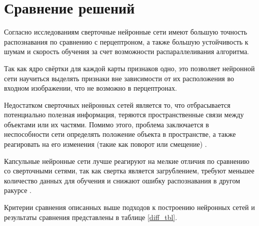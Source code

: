 \section{Сравнение решений}

Согласно исследованиям \cite{research1} сверточные нейронные сети имеют большую точность распознавания по сравнению с перцептроном, а также большую устойчивость к шумам и скорость обучения за счет возможности распараллеливания алгоритма.

Так как ядро свёртки для каждой карты признаков одно, это позволяет нейронной сети научиться выделять признаки вне зависимости от их расположения во входном изображении, что не возможно в перцептронах.

Недостатком сверточных нейронных сетей является то, что отбрасывается потенциально полезная информация, теряются пространственные связи между объектами или их частями. Помимо этого, проблема заключается в неспособности сети определять положение объекта в пространстве, а также реагировать на его изменения (такие как поворот или смещение) \cite{capsule2}.

Капсульные нейронные сети лучше реагируют на мелкие отличия по сравнению со сверточными сетями, так как свертка является загрублением, требуют меньшее количество данных для обучения и снижают ошибку распознавания в другом ракурсе \cite{galaxy}.

Критерии сравнения описанных выше подходов к построению нейронных сетей и результаты сравнения представлены в таблице \ref{diff_tbl}.

